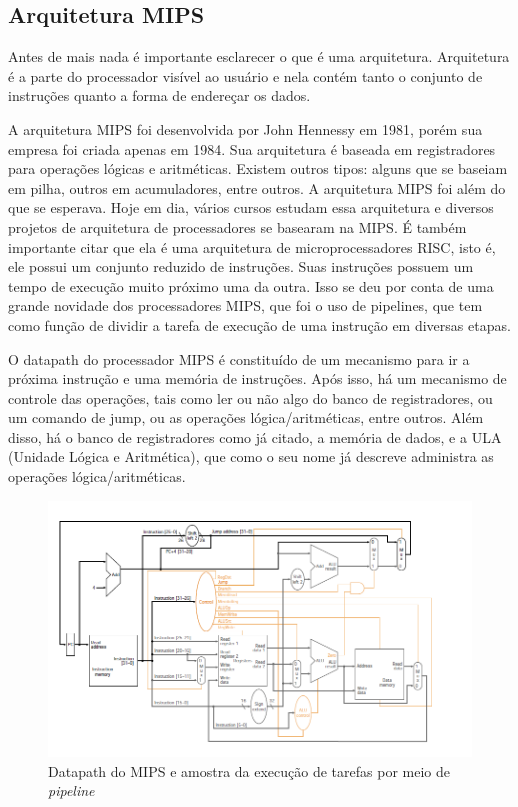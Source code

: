 \documentclass[a4paper]{sbgames}
\begin{document}
\subsection{Arquitetura MIPS}{
\label{sec:MIPS}
Antes de mais nada é importante esclarecer o que é uma arquitetura. Arquitetura é a parte do processador visível ao usuário e nela contém tanto o conjunto de instruções quanto a forma de endereçar os dados. 

A arquitetura MIPS \cite{patterson2005organizaccao} foi desenvolvida por John Hennessy em 1981, porém sua empresa foi criada apenas em 1984. Sua arquitetura é baseada em registradores para operações lógicas e aritméticas. Existem outros tipos: alguns que se baseiam em pilha, outros em acumuladores, entre outros. A arquitetura MIPS foi além do que se esperava. Hoje em dia, vários cursos estudam essa arquitetura e diversos projetos de arquitetura de processadores se basearam na MIPS. É também importante citar que ela é uma arquitetura de microprocessadores RISC, isto é, ele possui um conjunto reduzido de instruções. Suas instruções possuem um tempo de execução muito próximo uma da outra. Isso se deu por conta de uma grande novidade dos processadores MIPS, que foi o uso de pipelines, que tem como função de dividir a tarefa de execução de uma instrução em diversas etapas.

O datapath do processador MIPS é constituído de um mecanismo para ir a próxima instrução e uma memória de instruções. Após isso, há um mecanismo de controle das operações, tais como ler ou não algo do banco de registradores, ou um comando de jump, ou as operações lógica/aritméticas, entre outros. Além disso, há o banco de registradores como já citado, a memória de dados, e a ULA (Unidade Lógica e Aritmética), que como o seu nome já descreve administra as operações lógica/aritméticas.

\begin{figure}[htb]
  \begin{center}
   \includegraphics[width=1.0\linewidth]{./Figures/Datapath.png}
  \caption{Datapath do MIPS e amostra da execução de tarefas por meio de \textit{pipeline}}
  \end{center}
  \label{fig:02}
\end{figure}

}
\end{document}
